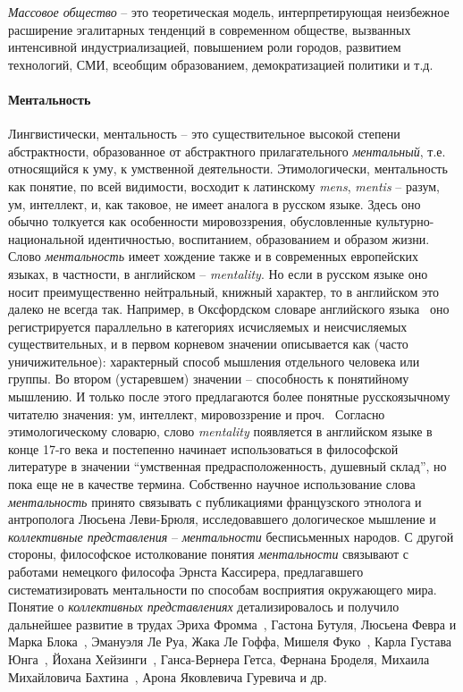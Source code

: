 \emph{Массовое общество} -- это теоретическая модель, интерпретирующая неизбежное расширение
эгалитарных тенденций в современном обществе, вызванных интенсивной индустриализацией,
повышением роли городов, развитием технологий, СМИ, всеобщим образованием,
демократизацией политики и т.д.

\paragraph{Ментальность}
\label{mentality}
Лингвистически, ментальность -- это существительное высокой степени абстрактности,
образованное от абстрактного прилагательного \emph{ментальный}, т.е. относящийся к уму,
к умственной деятельности. Этимологически, ментальность как понятие, по всей видимости,
восходит к латинскому \emph{mens}, \emph{mentis} -- разум, ум, интеллект, и, как таковое,
не имеет аналога в русском языке. Здесь оно обычно толкуется как особенности мировоззрения,
обусловленные культурно-национальной идентичностью, воспитанием, образованием и образом жизни.
Слово \emph{ментальность} имеет хождение также и в современных европейских языках, в частности,
в английском -- \emph{mentality}. Но если в русском языке оно носит преимущественно нейтральный,
книжный характер, то в английском это далеко не всегда так. Например, в Оксфордском словаре
английского языка~\autocite{oxford_dictionary} оно регистрируется параллельно в категориях
исчисляемых и неисчисляемых существительных, и в первом корневом значении описывается как
(часто уничижительное): характерный способ мышления отдельного человека или группы.
Во втором (устаревшем) значении -- способность к понятийному мышлению. И только после этого
предлагаются более понятные русскоязычному читателю значения: ум, интеллект, мировоззрение
и проч.~\autocite{oxford_dictionary}\autocite{oxford_american}\autocite{collins}\autocite{merriam}
Согласно этимологическому словарю, слово \emph{mentality} появляется в английском языке в
конце 17-го века и постепенно начинает использоваться в философской литературе в значении
``умственная предрасположенность, душевный склад'', но пока еще не в качестве термина.
Собственно научное использование слова \emph{ментальность} принято связывать с публикациями
французского этнолога и антрополога Люсьена Леви-Брюля, исследовавшего дологическое мышление и
\emph{коллективные представления} -- \emph{ментальности} бесписьменных народов.
С другой стороны, философское истолкование понятия \emph{ментальности} связывают с работами
немецкого философа Эрнста Кассирера, предлагавшего систематизировать ментальности по способам
восприятия окружающего мира. Понятие о \emph{коллективных представлениях} детализировалось и
получило дальнейшее развитие в трудах Эриха Фромма~\autocite{book:davydov}, Гастона Бутуля,
Люсьена Февра и Марка Блока~\autocite{book:febvre}, Эмануэля Ле Руа, Жака Ле Гоффа,
Мишеля Фуко~\autocite{book:arch}, Карла Густава Юнга~\autocite{book:yung},
Йохана Хейзинги~\autocite{book:heizenga}, Ганса-Вернера Гетса, Фернана Броделя, Михаила Михайловича
Бахтина~\autocite{book:tamarchenko}, Арона Яковлевича Гуревича и др.

